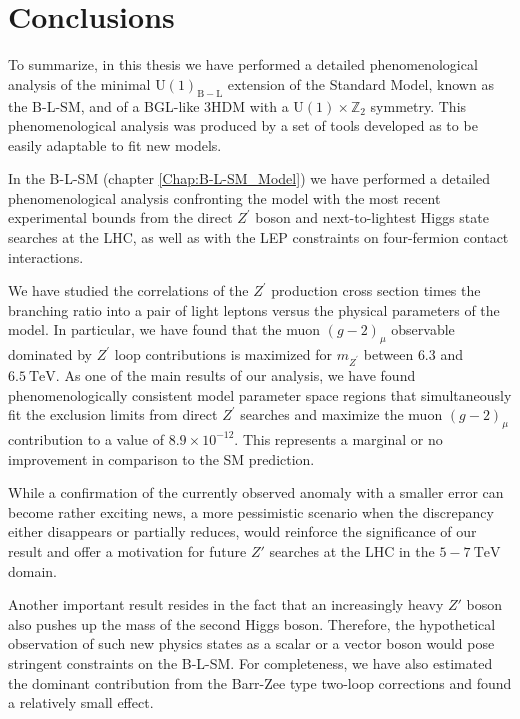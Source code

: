 \documentclass[10pt]{report}
\newcommand{\ro}[1]{\textrm{#1}}
\newcommand{\U}[1]{\mathrm{U}(1)_{\mathrm{#1}}}
\begin{document}
\chapter{Conclusions}
\label{ch:Conclusions}

To summarize, in this thesis we have performed a detailed phenomenological analysis of the minimal $\U{B-L}$ extension of the Standard Model, known as the B-L-SM, and of a BGL-like 3HDM with a $\mathrm{U(1)} \times \mathbb{Z}_2$ symmetry. 
%
This phenomenological analysis was produced by a set of tools developed as to be easily adaptable to fit new models. 

In the B-L-SM (chapter \ref{Chap:B-L-SM_Model}) we have performed a detailed phenomenological analysis confronting the model with the most recent experimental bounds from the direct $Z^\prime$ boson and next-to-lightest Higgs state searches at the LHC, as well as with the LEP constraints on four-fermion contact interactions.

We have studied the correlations of the $Z^\prime$ production cross section times the branching ratio 
into a pair of light leptons versus the physical parameters of the model. In particular, we have found 
that the muon $(g-2)_{\mu}$ observable dominated by $Z^\prime$ loop contributions is maximized 
for $m_{Z^\prime}$ between $6.3$ and $6.5~\ro{TeV}$. As one of the main results of our analysis, we have found phenomenologically consistent model parameter space regions that simultaneously fit the exclusion limits from direct $Z^\prime$ searches and maximize the muon $(g-2)_\mu$ contribution to a value of $8.9 \times 10^{-12}$. This represents a marginal or no improvement in comparison to the SM prediction.

While a confirmation of the currently observed anomaly with a smaller error can 
become rather exciting news, a more pessimistic scenario when the discrepancy either disappears or partially reduces, would reinforce the significance of our result and offer a motivation for future $Z'$ searches at the LHC in the $5-7~\mathrm{TeV}$ domain. 

Another important result resides in the fact that an increasingly heavy $Z'$ boson also pushes up 
the mass of the second Higgs boson. Therefore, the hypothetical observation of such new physics 
states as a scalar or a vector boson would pose stringent constraints on the B-L-SM.
For completeness, we have also estimated the dominant contribution from the Barr-Zee type 
two-loop corrections and found a relatively small effect.
\end{document}
